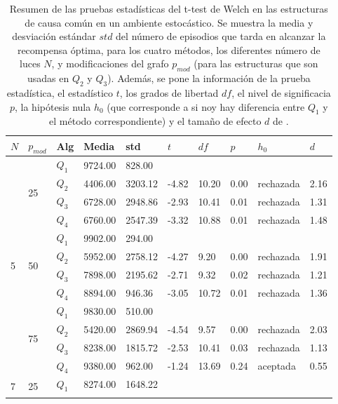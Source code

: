 \begin{table}[]
\centering
\caption{Resumen de las pruebas estadísticas del t-test de Welch en las
estructuras de causa común en un ambiente estocástico. Se muestra la media y desviación estándar $std$ del número 
de episodios que tarda en alcanzar la recompensa óptima, para los cuatro métodos, los diferentes número de luces $N$, y modificaciones del grafo $p_{mod}$ (para las estructuras que son usadas en $Q_2$ y $Q_3$). Además, se pone la información
de la prueba estadística, el estadístico $t$, los grados de libertad $df$, el nivel
de significacia $p$, la hipótesis nula $h_0$ (que corresponde a si noy hay diferencia entre $Q_1$ y el método correspondiente) y el tamaño de efecto $d$ de \citet{cohen2013statistical}.}
\label{tab:common-cause-pmod-sto}
\begin{tabular}{|l|l|l|l|l|l|l|l|l|l|}
\hline
$N$ & $p_{mod}$ & Alg & Media & std & $t$ & $df$ & $p$ & $h_0$ & $d$ \\ \hline
\multirow{12}{*}{5} & \multirow{4}{*}{25} & $Q_1$ & 9724.00 & 828.00 & \multicolumn{5}{l|}{} \\ \cline{3-10} 
 &  & $Q_2$ & 4406.00 & 3203.12 & -4.82 & 10.20 & 0.00 & rechazada & 2.16 \\ \cline{3-10} 
 &  & $Q_3$ & 6728.00 & 2948.86 & -2.93 & 10.41 & 0.01 & rechazada & 1.31 \\ \cline{3-10} 
 &  & $Q_4$ & 6760.00 & 2547.39 & -3.32 & 10.88 & 0.01 & rechazada & 1.48 \\ \cline{2-10} 
 & \multirow{4}{*}{50} & $Q_1$ & 9902.00 & 294.00 & \multicolumn{5}{l|}{} \\ \cline{3-10} 
 &  & $Q_2$ & 5952.00 & 2758.12 & -4.27 & 9.20 & 0.00 & rechazada & 1.91 \\ \cline{3-10} 
 &  & $Q_3$ & 7898.00 & 2195.62 & -2.71 & 9.32 & 0.02 & rechazada & 1.21 \\ \cline{3-10} 
 &  & $Q_4$ & 8894.00 & 946.36 & -3.05 & 10.72 & 0.01 & rechazada & 1.36 \\ \cline{2-10} 
 & \multirow{4}{*}{75} & $Q_1$ & 9830.00 & 510.00 & \multicolumn{5}{l|}{} \\ \cline{3-10} 
 &  & $Q_2$ & 5420.00 & 2869.94 & -4.54 & 9.57 & 0.00 & rechazada & 2.03 \\ \cline{3-10} 
 &  & $Q_3$ & 8238.00 & 1815.72 & -2.53 & 10.41 & 0.03 & rechazada & 1.13 \\ \cline{3-10} 
 &  & $Q_4$ & 9380.00 & 962.00 & -1.24 & 13.69 & 0.24 & aceptada & 0.55 \\ \hline
\multirow{12}{*}{7} & \multirow{4}{*}{25} & $Q_1$ & 8274.00 & 1648.22 & \multicolumn{5}{l|}{} \\ \cline{3-10} 

\end{tabular}
\end{table}
